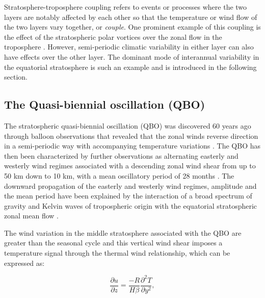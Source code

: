 Stratosphere-troposphere coupling refers to events or processes where the two layers are notably affected by each other so that the temperature or wind flow of the two layers vary together, or \textit{couple}. One prominent example of this coupling is the effect of the stratospheric polar vortices over the zonal flow in the troposphere \citep{thompson2005,domeisen2019}. 
However, semi-periodic climatic variability in either layer can also have effects over the other layer. The dominant mode of interannual variability in the equatorial stratosphere is such an example and is introduced in the following section. 


\subsection{The Quasi-biennial oscillation (QBO)}

The stratospheric quasi-biennial oscillation (QBO) was discovered 60 years ago through balloon observations  that revealed that the zonal winds reverse direction in a semi-periodic way with accompanying temperature variations \citep{ebdon1960,reed1964}. The QBO has then been characterized by further observations as alternating easterly and westerly wind regimes associated with a descending zonal wind shear from up to 50 km down to 10 km, with a mean oscillatory period of 28 months \citep{baldwin2001}. 
The downward propagation of the easterly and westerly wind regimes, amplitude and the mean period have been explained by the interaction of a broad spectrum of gravity and Kelvin waves of tropospheric origin with the equatorial stratospheric zonal mean flow  \citep{baldwin2001}.

The wind variation in the middle stratosphere associated with the QBO are greater than the seasonal cycle \citep{andrews1987} and this vertical wind shear imposes a temperature signal through the thermal wind relationship, which can be expressed as: 

\begin{equation}
\frac{\partial{u}}{\partial{z}}=\frac{-R}{H \beta}\frac{\partial^2 T}{\partial y^2}, 
\end{equation}

